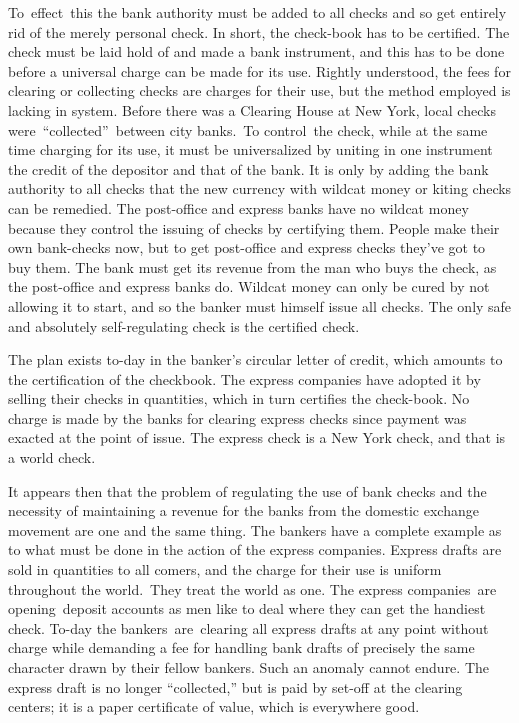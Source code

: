 \documentclass[twoside,symmetric,nobib,justified]{tufte-book}
\begin{document}
To~effect~this the bank authority must be added to all checks and so
get entirely rid of the merely personal check. In short, the check-book
has to be certified. The check must be laid hold of and made a bank
instrument, and this has to be done before a universal charge can be
made for its use. Rightly understood, the fees for clearing or
collecting checks are charges for their use, but the method employed is
lacking in system. Before there was a Clearing House at New York, local
checks were~``collected''~between city banks.~To control~the check,
while at the same time charging for its use, it must be universalized by
uniting in one instrument the credit of the depositor and that of the
bank. It is only by adding the bank authority to all checks that the new
currency with wildcat money or kiting checks can be remedied. The
post-office and express banks have no wildcat money because they control
the issuing of checks by certifying them. People make their own
bank-checks now, but to get post-office and express checks they've got
to buy them. The bank must get its revenue from the man who buys the
check, as the post-office and express banks do. Wildcat money can only
be cured by not allowing it to start, and so the banker must himself
issue all checks. The only safe and absolutely self-regulating check is
the certified check.~

The plan exists to-day in the banker's circular letter of credit, which
amounts to the certification of the checkbook. The express companies
have adopted it by selling their checks in quantities, which in turn
certifies the check-book. No charge is made by the banks for clearing
express checks since payment was exacted at the point of issue. The
express check is a New York check, and that is a world check.~

It appears then that the problem of regulating the use of bank checks
and the necessity of maintaining a revenue for the banks from the
domestic exchange movement are one and the same thing. The bankers have
a complete example as to what must be done in the action of the express
companies. Express drafts are sold in quantities to all comers, and the
charge for their use is uniform throughout the world.~They treat the
world as one. The express companies~are opening~deposit accounts as men
like to deal where they can get the handiest check. To-day the
bankers~are~clearing all express drafts at any point without charge
while demanding a fee for handling bank drafts of precisely the same
character drawn by their fellow bankers. Such an anomaly cannot endure.
The express draft is no longer ``collected,'' but is paid by set-off at
the clearing centers; it is a paper certificate of value, which is
everywhere good. ~
\end{document}
